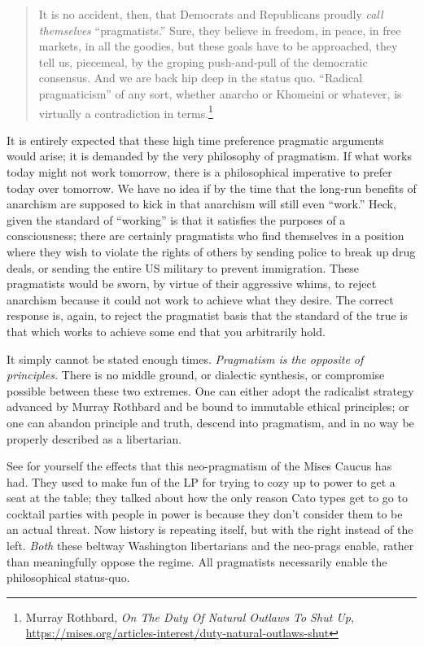\documentclass[11pt]{article}
\begin{document}
\begin{quote}
It is no accident, then, that Democrats and Republicans proudly \emph{call themselves} ``pragmatists.'' Sure, they believe in freedom, in peace, in free markets, in all the goodies, but these goals have to be approached, they tell us, piecemeal, by the groping push-and-pull of the democratic consensus. And we are back hip deep in the status quo. ``Radical pragmaticism'' of any sort, whether anarcho or Khomeini or whatever, is virtually a contradiction in terms.\footnote{Murray Rothbard, \emph{On The Duty Of Natural Outlaws To Shut Up}, \url{https://mises.org/articles-interest/duty-natural-outlaws-shut}}
\end{quote}

It is entirely expected that these high time preference pragmatic arguments would arise; it is demanded by the very philosophy of pragmatism. If what works today might not work tomorrow, there is a philosophical imperative to prefer today over tomorrow. We have no idea if by the time that the long-run benefits of anarchism are supposed to kick in that anarchism will still even ``work.'' Heck, given the standard of ``working'' is that it satisfies the purposes of a consciousness; there are certainly pragmatists who find themselves in a position where they wish to violate the rights of others by sending police to break up drug deals, or sending the entire US military to prevent immigration. These pragmatists would be sworn, by virtue of their aggressive whims, to reject anarchism because it could not work to achieve what they desire. The correct response is, again, to reject the pragmatist basis that the standard of the true is that which works to achieve some end that you arbitrarily hold.

It simply cannot be stated enough times. \emph{Pragmatism is the opposite of principles.} There is no middle ground, or dialectic synthesis, or compromise possible between these two extremes. One can either adopt the radicalist strategy advanced by Murray Rothbard and be bound to immutable ethical principles; or one can abandon principle and truth, descend into pragmatism, and in no way be properly described as a libertarian.

See for yourself the effects that this neo-pragmatism of the Mises Caucus has had. They used to make fun of the LP for trying to cozy up to power to get a seat at the table; they talked about how the only reason Cato types get to go to cocktail parties with people in power is because they don't consider them to be an actual threat. Now history is repeating itself, but with the right instead of the left. \emph{Both} these beltway Washington libertarians and the neo-prags enable, rather than meaningfully oppose the regime. All pragmatists necessarily enable the philosophical status-quo.
\end{document}
